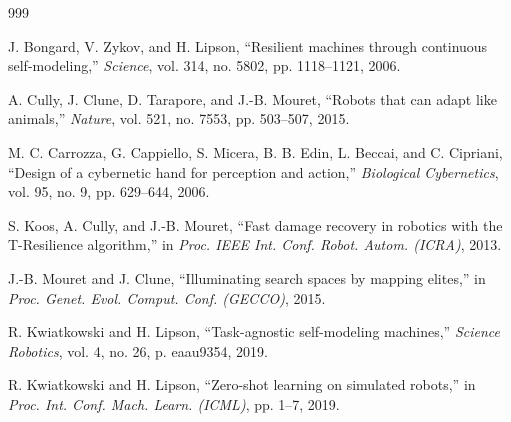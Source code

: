 \documentclass[11pt,a4paper]{article}
\begin{document}

\begin{thebibliography}{999}





J. Bongard, V. Zykov, and H. Lipson, ``Resilient machines through continuous self-modeling,'' \textit{Science}, vol. 314, no. 5802, pp. 1118--1121, 2006.




A. Cully, J. Clune, D. Tarapore, and J.-B. Mouret, ``Robots that can adapt like animals,'' \textit{Nature}, vol. 521, no. 7553, pp. 503--507, 2015.




M. C. Carrozza, G. Cappiello, S. Micera, B. B. Edin, L. Beccai, and C. Cipriani, ``Design of a cybernetic hand for perception and action,'' \textit{Biological Cybernetics}, vol. 95, no. 9, pp. 629--644, 2006.




S. Koos, A. Cully, and J.-B. Mouret, ``Fast damage recovery in robotics with the T-Resilience algorithm,'' in \textit{Proc. IEEE Int. Conf. Robot. Autom. (ICRA)}, 2013.




J.-B. Mouret and J. Clune, ``Illuminating search spaces by mapping elites,'' in \textit{Proc. Genet. Evol. Comput. Conf. (GECCO)}, 2015.




R. Kwiatkowski and H. Lipson, ``Task-agnostic self-modeling machines,'' \textit{Science Robotics}, vol. 4, no. 26, p. eaau9354, 2019.




R. Kwiatkowski and H. Lipson, ``Zero-shot learning on simulated robots,'' in \textit{Proc. Int. Conf. Mach. Learn. (ICML)}, pp. 1--7, 2019.





\end{thebibliography}
\end{document}
